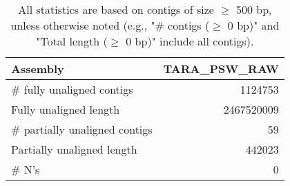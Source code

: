 \documentclass[12pt,a4paper]{article}
\begin{document}
\begin{table}[ht]
\begin{center}
\caption{All statistics are based on contigs of size $\geq$ 500 bp, unless otherwise noted (e.g., "\# contigs ($\geq$ 0 bp)" and "Total length ($\geq$ 0 bp)" include all contigs).}
\begin{tabular}{|l*{1}{|r}|}
\hline
Assembly & TARA\_PSW\_RAW \\ \hline
\# fully unaligned contigs & 1124753 \\ \hline
Fully unaligned length & 2467520009 \\ \hline
\# partially unaligned contigs & 59 \\ \hline
Partially unaligned length & 442023 \\ \hline
\# N's & 0 \\ \hline
\end{tabular}
\end{center}
\end{table}
\end{document}
